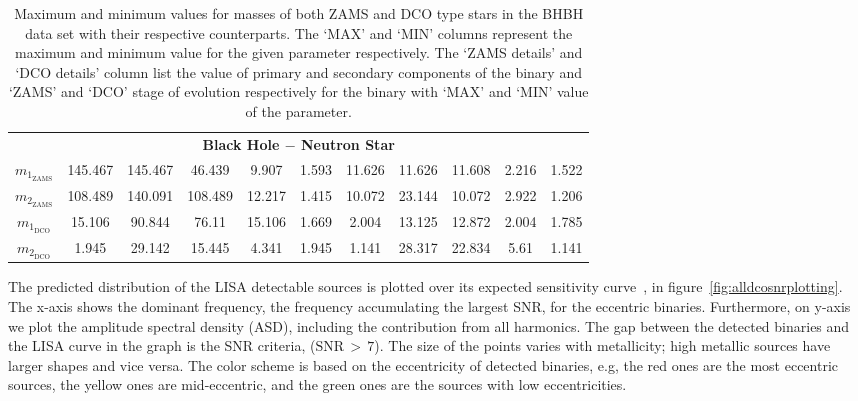 \documentclass[journal, twocolumn]{IEEEtran}
\newcommand{\mone}[1]{m_{1_{\text{#1}}}}
\newcommand{\mtwo}[1]{m_{2_{\text{#1}}}}
\begin{document}
\begin{table}[!ht]
{\begin{tabular}{@{}ccccccccccc@{}}
				\multicolumn{11}{c}{\textbf{Black Hole $-$ Neutron Star}} \\

				$\mone{ZAMS}$ & 145.467 & 145.467 & 46.439 & 9.907 & 1.593 & 11.626 & 11.626 & 11.608 & 2.216 & 1.522 \\
				$\mtwo{ZAMS}$ & 108.489 & 140.091 & 108.489 & 12.217 & 1.415 & 10.072 & 23.144 & 10.072 & 2.922 & 1.206 \\
				$\mone{DCO}$ & 15.106 & 90.844 & 76.11 & 15.106 & 1.669 & 2.004 & 13.125 & 12.872 & 2.004 & 1.785 \\
				$\mtwo{DCO}$ & 1.945 & 29.142 & 15.445 & 4.341 & 1.945 & 1.141 & 28.317 & 22.834 & 5.61 & 1.141 \\ \bottomrule
			\end{tabular}%
		}
		\caption{Maximum and minimum values for masses of both ZAMS and DCO type stars in the BHBH data set with their respective counterparts. The `MAX' and `MIN' columns represent the maximum and minimum value for the given parameter respectively. The `ZAMS details' and `DCO details' column list the value of primary and secondary components of the binary and `ZAMS' and `DCO' stage of evolution respectively for the binary with `MAX' and `MIN' value of the parameter.}
		\label{tab:bhbh-details-table}
	\end{table}

    The predicted distribution of the LISA detectable sources is plotted over its expected sensitivity curve~\cite{Robson2019}, in figure~\ref{fig:alldcosnrplotting}.
    The x-axis shows the dominant frequency, the frequency accumulating the largest SNR, for the eccentric binaries.
    Furthermore, on y-axis we plot the amplitude spectral density (ASD), including the contribution from all harmonics.
    The gap between the detected binaries and the LISA curve in the graph is the SNR criteria, ($\text{SNR}\,>\,7$).
    The size of the points varies with metallicity; high metallic sources have larger shapes and vice versa.
    The color scheme is based on the eccentricity of detected binaries, e.g, the red ones are the most eccentric sources, the yellow ones are mid-eccentric, and the green ones are the sources with low eccentricities.
\end{document}
